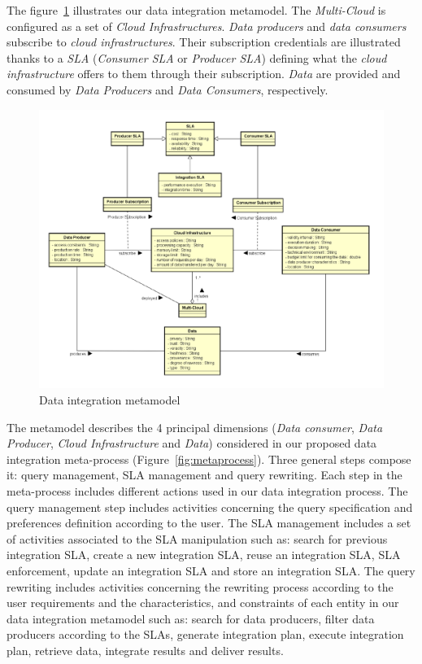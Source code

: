 The figure~\ref{fig:scenario} illustrates our data integration metamodel.
The \textsl{Multi-Cloud} is configured as a set of \textsl{Cloud Infrastructures}. \textsl{Data producers} and \textsl{data consumers} subscribe to \textsl{cloud infrastructures}. 
Their subscription credentials are illustrated thanks to a \textsl{SLA} (\textsl{Consumer SLA} or \textsl{Producer SLA}) defining what the \textsl{cloud infrastructure} offers to them through their subscription. 
\textsl{Data} are provided and consumed by \textsl{Data Producers} and \textsl{Data Consumers}, respectively.

\begin{figure}[th!]
\center
\includegraphics[scale=0.50]{metamodel.pdf}
\caption{Data integration metamodel}\label{fig:scenario}
\end{figure}

The metamodel describes the 4 principal dimensions (\textsl{Data consumer}, \textsl{Data Producer}, \textsl{Cloud Infrastructure} and \textsl{Data}) considered in our proposed data integration meta-process (Figure~\ref{fig:metaprocess}).
Three general steps compose it: query management, SLA management and query rewriting. Each step in the meta-process includes different actions used in our data integration process.
The query management step includes activities concerning the query specification and preferences definition according to the user. The SLA management includes a set of activities associated to the SLA manipulation such as: search for previous integration SLA, create a new integration SLA, reuse an integration SLA, SLA enforcement, update an integration SLA and store an integration SLA. The query rewriting includes activities concerning the rewriting process according to the user requirements and the characteristics, and constraints of each entity in our data integration metamodel such as: search for data producers, filter data producers according to the SLAs, generate integration plan, execute integration plan, retrieve data, integrate results and deliver results.

